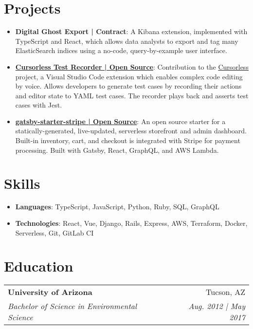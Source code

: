 \documentclass[letterpaper,11pt]{article}
\makeatletter
\newcommand{\resumeHeading}[4]{
  \vspace{6pt}
  \begin{tabular*}{0.97\textwidth}[t]{l@{\extracolsep{\fill}}r}
    \textbf{#1} & #2 \\
    \textit{\small#3} & \textit{\small #4} \\
  \end{tabular*}\vspace{-5pt}
}
\newenvironment{resumeList}{\begin{itemize}[leftmargin=*]}{\end{itemize}\vspace{-5pt}}
\newcommand{\resumeTitledItem}[2]{
  \item\small{
    \textbf{#1}{: #2 \vspace{-2pt}}
  }
}
\makeatother
\begin{document}
\section{Projects}
  \begin{resumeList}
    \resumeTitledItem{Digital Ghost Export | Contract}
    {A Kibana extension, implemented with TypeScript and React, which allows data analysts to export and tag many ElasticSearch indices using a no-code, query-by-example user interface.}
    \resumeTitledItem{\href{https://github.com/cursorless-dev/cursorless-vscode}{Cursorless Test Recorder | Open Source}}
      {Contribution to the {\href{https://github.com/cursorless-dev/cursorless-vscode}{Cursorless}} project, a Visual Studio Code extension which enables complex code editing by voice. Allows developers to generate test cases by recording their actions and editor state to YAML test cases. The recorder plays back and asserts test cases with Jest.}
    \resumeTitledItem{\href{https://github.com/brxck/gatsby-starter-stripe}{gatsby-starter-stripe | Open Source}}
      {An open source starter for a statically-generated, live-updated, serverless storefront and admin dashboard. Built-in inventory, cart, and checkout is integrated with Stripe for payment processing. Built with Gatsby, React, GraphQL, and AWS Lambda.}
  \end{resumeList}

\section{Skills}
  \begin{resumeList}
    \resumeTitledItem{Languages}{TypeScript, JavaScript, Python, Ruby, SQL, GraphQL}
    \resumeTitledItem{Technologies}{React, Vue, Django, Rails, Express, AWS, Terraform, Docker, Serverless, Git, GitLab CI}
  \end{resumeList}

\section{Education}
  \resumeHeading
  {University of Arizona}{Tucson, AZ}
  {Bachelor of Science in Environmental Science}{Aug. 2012 | May 2017}
\end{document}
